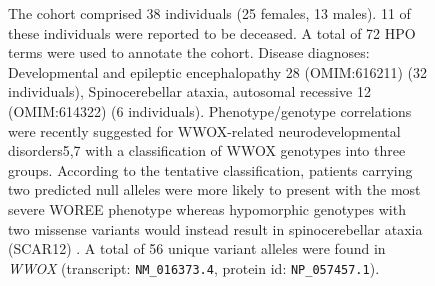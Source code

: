\begin{figure}[htbp]
\vspace{2em}

\caption{ The cohort comprised 38 individuals (25 females, 13 males). 11 of these individuals were reported to be deceased. A total of 72 HPO terms were used to annotate the cohort. Disease diagnoses: Developmental and epileptic encephalopathy 28 (OMIM:616211) (32 individuals), Spinocerebellar ataxia, autosomal recessive 12 (OMIM:614322) (6 individuals). Phenotype/genotype correlations were recently suggested for WWOX-related neurodevelopmental disorders5,7 
with a classification of WWOX genotypes into three groups. According to the tentative classification, patients carrying 
two predicted null alleles were more likely to present with the most severe WOREE phenotype whereas hypomorphic genotypes 
with two missense variants would instead result in spinocerebellar ataxia (SCAR12) \cite{PMID_30356099,PMID_25716914,PMID_25411445}. A total of 56 unique variant alleles were found in \textit{WWOX} (transcript: \texttt{NM\_016373.4}, protein id: \texttt{NP\_057457.1}).}
\end{figure}
